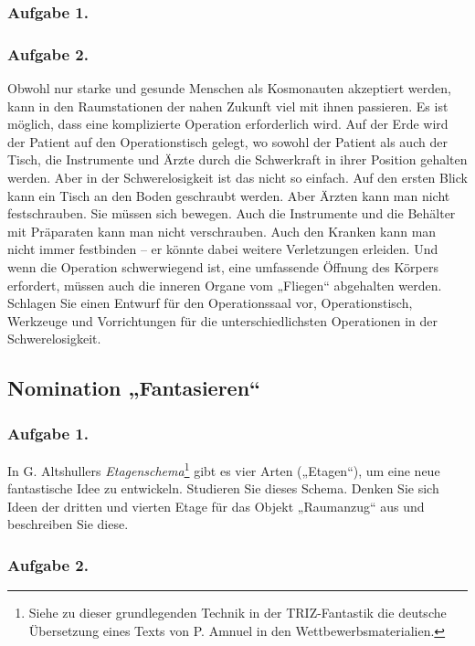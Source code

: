 \documentclass[11pt,a4paper]{article}
\begin{document}
\newcommand{\CosmicOperation}{Obwohl nur starke und gesunde Menschen als
  Kosmonauten akzeptiert werden, kann in den Raumstationen der nahen Zukunft
  viel mit ihnen passieren. Es ist möglich, dass eine komplizierte Operation
  erforderlich wird. Auf der Erde wird der Patient auf den Operationstisch
  gelegt, wo sowohl der Patient als auch der Tisch, die Instrumente und Ärzte
  durch die Schwerkraft in ihrer Position gehalten werden. Aber in der
  Schwerelosigkeit ist das nicht so einfach. Auf den ersten Blick kann ein
  Tisch an den Boden geschraubt werden. Aber Ärzten kann man nicht
  festschrauben. Sie müssen sich bewegen. Auch die Instrumente und die
  Behälter mit Präparaten kann man nicht verschrauben. Auch den Kranken kann
  man nicht immer festbinden -- er könnte dabei weitere Verletzungen erleiden.
  Und wenn die Operation schwerwiegend ist, eine umfassende Öffnung des
  Körpers erfordert, müssen auch die inneren Organe vom „Fliegen“ abgehalten
  werden.  Schlagen Sie einen Entwurf für den Operationssaal vor,
  Operationstisch, Werkzeuge und Vorrichtungen für die unterschiedlichsten
  Operationen in der Schwerelosigkeit.}

\subsubsection*{Aufgabe 1.}\Aberration
\subsubsection*{Aufgabe 2.}\CosmicOperation

\subsection{Nomination „Fantasieren“}

\subsubsection*{Aufgabe 1.}

In G. Altshullers \emph{Etagenschema}\footnote{Siehe zu dieser grundlegenden
  Technik in der TRIZ-Fantastik die deutsche Übersetzung eines Texts von
  P. Amnuel in den Wettbewerbsmaterialien.} gibt es vier Arten („Etagen“), um
eine neue fantastische Idee zu entwickeln. Studieren Sie dieses Schema.
Denken Sie sich Ideen der dritten und vierten Etage für das Objekt „Raumanzug“
aus und beschreiben Sie diese.


\subsubsection*{Aufgabe 2.}
\end{document}
